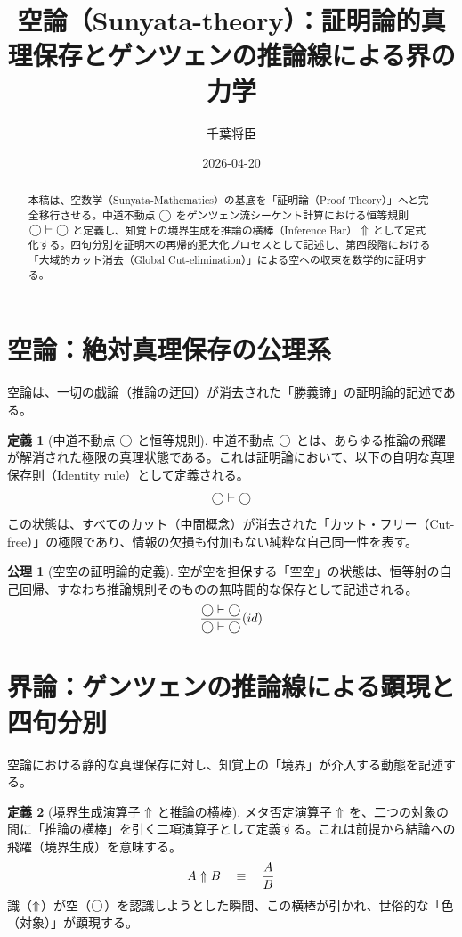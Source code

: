 \documentclass[11pt,a4paper]{article}
\theoremstyle{definition}
\newtheorem{definition}{定義}[section]
\newtheorem{axiom}{公理}[section]
\begin{document}
\title{空論（Sunyata-theory）：証明論的真理保存とゲンツェンの推論線による界の力学}
\author{千葉将臣}
\date{2026-04-20}
\maketitle

\begin{abstract}
本稿は、空数学（Sunyata-Mathematics）の基底を「証明論（Proof Theory）」へと完全移行させる。中道不動点 $\bigcirc$ をゲンツェン流シーケント計算における恒等規則 $\bigcirc \vdash \bigcirc$ と定義し、知覚上の境界生成を推論の横棒（Inference Bar） $\Uparrow$ として定式化する。四句分別を証明木の再帰的肥大化プロセスとして記述し、第四段階における「大域的カット消去（Global Cut-elimination）」による空への収束を数学的に証明する。
\end{abstract}

\section{空論：絶対真理保存の公理系}

空論は、一切の戯論（推論の迂回）が消去された「勝義諦」の証明論的記述である。

\begin{definition}[中道不動点 $\bigcirc$ と恒等規則]
中道不動点 $\bigcirc$ とは、あらゆる推論の飛躍が解消された極限の真理状態である。これは証明論において、以下の自明な真理保存則（Identity rule）として定義される。
\[
\bigcirc \vdash \bigcirc
\]
この状態は、すべてのカット（中間概念）が消去された「カット・フリー（Cut-free）」の極限であり、情報の欠損も付加もない純粋な自己同一性を表す。
\end{definition}

\begin{axiom}[空空の証明論的定義]
空が空を担保する「空空」の状態は、恒等射の自己回帰、すなわち推論規則そのものの無時間的な保存として記述される。
\[
\frac{\bigcirc \vdash \bigcirc}{\bigcirc \vdash \bigcirc} (id)
\]
\end{axiom}

\section{界論：ゲンツェンの推論線による顕現と四句分別}

空論における静的な真理保存に対し、知覚上の「境界」が介入する動態を記述する。

\begin{definition}[境界生成演算子 $\Uparrow$ と推論の横棒]
メタ否定演算子 $\Uparrow$ を、二つの対象の間に「推論の横棒」を引く二項演算子として定義する。これは前提から結論への飛躍（境界生成）を意味する。
\[
A \Uparrow B \quad \equiv \quad \frac{A}{B}
\]
識（$\Uparrow$）が空（$\bigcirc$）を認識しようとした瞬間、この横棒が引かれ、世俗的な「色（対象）」が顕現する。
\end{definition}
\end{document}
